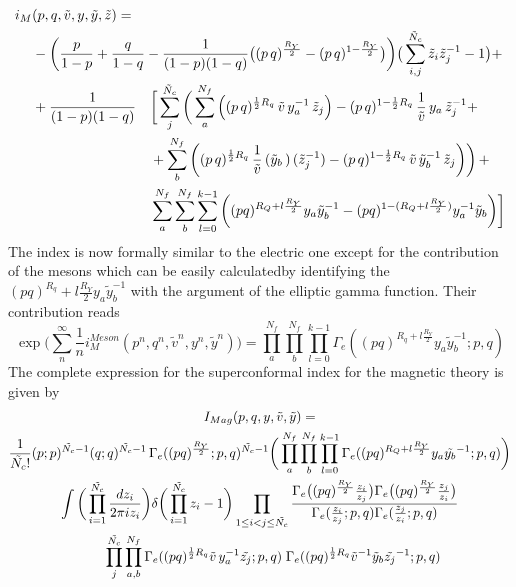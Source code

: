 \begin{equation}
\begin{aligned}
 i_M &(p,q, \tilde v, y,\tilde y ,\tilde z) = \\
& -\bigg({p \over 1-p}+{q \over 1-q} -{1 \over (1-p)(1-q)} \big((p\,q)^{\frac{R_Y}{2}}- (p\,q)^{1-\frac{R_Y}{2}}\big)
\bigg) \big( \sum_{i,j}^{\tilde N_c} \tilde z_i \tilde z_j^{-1} -1\big ) + \\
&
\begin{aligned}
& +{1\over (1-p)(1-q)} && \bigg[ \sum_j^{\tilde N_c} \bigg( \sum_a^{N_f}\left(  (p\,q)^{{1 \over 2 } R_q} \,\tilde v \, y_a^{-1}\, \tilde z_j\right) 
-  (p\,q)^{1- {1\over 2}R_q} \, {1 \over \tilde v}\, y_a\,
\tilde z_j^{-1} + \\
&  &&+ \sum_b^{N_f} \left( (p\,q)^{{1 \over 2 } R_q}\, {1\over \tilde v}\,
({\tilde y_b}\,) \,
(\tilde z_j^{-1})
- (p\,q)^{1-  {1\over 2}R_q} \, \tilde v \,
{\tilde y_b}^{-1} \,
\tilde z_j \bigg) \right) + \\
 & &&\sum_a^{N_f} \sum_b^{N_f} \sum_{l=0}^{k-1}   \bigg(  (pq)^{ R_Q + l \frac{R_Y}{2}   } y_a \tilde y_b^{-1}   - (pq)^{1 -( R_Q + l \frac{R_Y}{2}  )}
y_a^{-1}  {\tilde y_b}  \bigg) \bigg] 
\end{aligned}
\end{aligned}
\end{equation}
The index is now formally similar to the electric one except for the contribution of the mesons which can be easily calculatedby identifying the $(pq)^{R_q} + l \frac{R_Y}{2} y_a \tilde{y}_b^{-1}$ with the argument of the elliptic gamma function.
Their contribution reads
\begin{equation}
 \exp \bigg( \sum_{n}^{\infty} \frac{1}{n} i_M^{Meson} (p^n,q^n, \tilde v^n, y^n,\tilde {y}^n) \bigg) = 
\prod_a^{N_f} \prod_b^{N_f}  \prod_{l=0}^{k-1} \Gamma_e ( (pq)^{R_q + l \frac{R_Y}{2}} y_a \tilde{y}_b^{-1} ; p ,q)
\end{equation}
The complete expression for the superconformal index for the magnetic theory is given by
\begin{multline}
I_{Mag} ( p,q,y,\tilde v,\tilde y) = \\
 { 1 \over \tilde{N_c} !} (p;p)^{\tilde{N_c}-1} ( q;q)^{\tilde{N_c}-1} \, 
 \Gamma_e( (pq)^\frac{R_Y}{2};p,q)^{\tilde{N_c}-1} \bigg( \prod_a^{N_f} \prod_b^{N_f}  \prod_{l=0}^{k-1} \Gamma_e ( (pq)^{R_Q + l \frac{R_Y}{2}} y_a \tilde{y_b}^{-1}; p ,q) \bigg) \\
\int \bigg( \prod_{i=1}^{ \tilde{N_c }} { d z_i \over { 2 \pi i z_i} } \bigg) \delta \bigg( \prod_{i=1}^{\tilde{N_c}} z_i - 1 \bigg)
\prod_{ 1 \leq i < j \leq \tilde{N_c}} \frac{ \Gamma_e \big( (pq)^\frac{R_Y}{2} {z_i \over z_j} \big) \Gamma_e \big( (pq)^\frac{R_Y}{2} {z_j \over z_i} \big) }{ \Gamma_e( {z_i \over z_j};p,q) \Gamma_e({z_j \over z_i}; p,q)} \\
  \qquad \prod_{ j}^{\tilde{N_c}} \prod_{ a,b}^{N_f} \Gamma_e ( (pq)^{{1 \over 2 } R_q} \tilde{v}\,  y_a^{-1} \tilde{z_j} ; p,q)
\; \Gamma_e ( (pq)^{{1 \over 2 } R_q} \tilde{v}^{-1} \tilde {y}_b \tilde{z_j}^{-1} ; p,q)
\end{multline}

